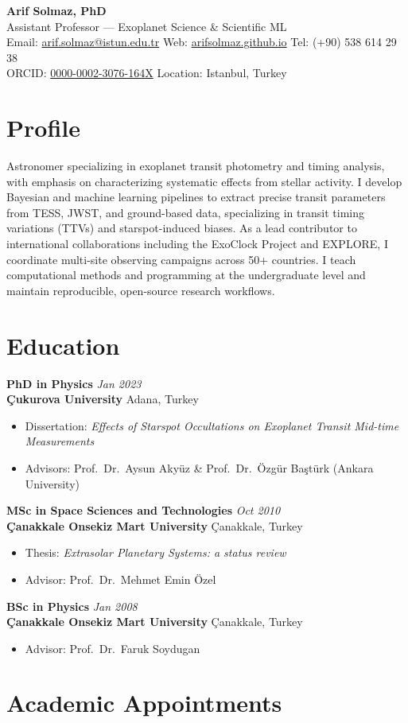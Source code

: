 \documentclass[11pt,a4paper]{article}
\newcommand{\makeheader}[3]{
    \begin{center}
        {\Huge\bfseries\color{accentcolor} #1} \\[0.2em]
        {\Large\color{darkgray} #2} \\[0.4em]
        \small
        Email: \href{mailto:#3}{#3} \quad
        Web: \href{https://arifsolmaz.github.io}{arifsolmaz.github.io} \quad
        Tel: (+90) 538 614 29 38 \\[0.1em]
        ORCID: \href{https://orcid.org/0000-0002-3076-164X}{0000-0002-3076-164X} \quad
        Location: Istanbul, Turkey
    \end{center}
    \vspace{-1.0em}
}
\newcommand{\cventry}[4]{
  \vspace{4pt}
  \textbf{#1} \hfill \textit{#3} \\
  \textbf{\color{darkgray} #2} \hfill #4 \\
}
\newcommand{\cvdesc}[1]{
  \vspace{-1pt}
  \begin{itemize}[leftmargin=12pt, nosep, label=\small\textbullet]
    \small #1
  \end{itemize}
}
\begin{document}
\makeheader
    {Arif Solmaz, PhD}
    {Assistant Professor --- Exoplanet Science \& Scientific ML}
    {arif.solmaz@istun.edu.tr}

\section{Profile}
Astronomer specializing in exoplanet transit photometry and timing analysis, with emphasis on characterizing systematic effects from stellar activity. I develop Bayesian and machine learning pipelines to extract precise transit parameters from TESS, JWST, and ground-based data, specializing in transit timing variations (TTVs) and starspot-induced biases. As a lead contributor to international collaborations including the ExoClock Project and EXPLORE, I coordinate multi-site observing campaigns across 50+ countries. I teach computational methods and programming at the undergraduate level and maintain reproducible, open-source research workflows.

\section{Education}

\cventry{PhD in Physics}{Çukurova University}{Jan 2023}{Adana, Turkey}
\cvdesc{
    \item Dissertation: \textit{Effects of Starspot Occultations on Exoplanet Transit Mid-time Measurements}
    \item Advisors: Prof.\ Dr.\ Aysun Akyüz \& Prof.\ Dr.\ Özgür Baştürk (Ankara University)
}

\cventry{MSc in Space Sciences and Technologies}{Çanakkale Onsekiz Mart University}{Oct 2010}{Çanakkale, Turkey}
\cvdesc{
    \item Thesis: \textit{Extrasolar Planetary Systems: a status review}
    \item Advisor: Prof.\ Dr.\ Mehmet Emin Özel
}

\cventry{BSc in Physics}{Çanakkale Onsekiz Mart University}{Jan 2008}{Çanakkale, Turkey}
\cvdesc{
    \item Advisor: Prof.\ Dr.\ Faruk Soydugan
}

\section{Academic Appointments}
\end{document}
